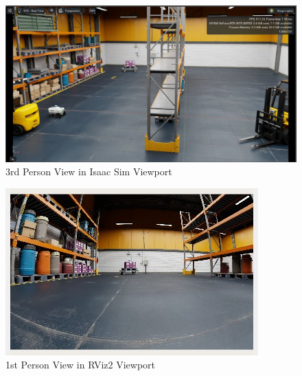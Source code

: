 \documentclass[
  letterpaper,
  DIV=11,
  numbers=noendperiod]{scrartcl}
\begin{document}
\begin{figure}

{\centering \includegraphics{3rd-person-view.png}

}

\caption{\label{fig-3rd-person-view}3rd Person View in Isaac Sim
Viewport}

\end{figure}

\begin{figure}

{\centering \includegraphics{1st-person-view.png}

}

\caption{\label{fig-1st-person-view}1st Person View in RViz2 Viewport}

\end{figure}
\end{document}
